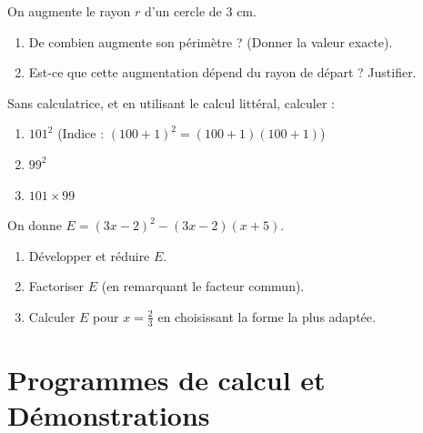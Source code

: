 \documentclass[a4paper]{book}
\begin{document}
    \begin{exercice}
        On augmente le rayon $r$ d'un cercle de 3 cm. 
        \begin{enumerate}
            \item De combien augmente son périmètre ? (Donner la valeur exacte).
            \item Est-ce que cette augmentation dépend du rayon de départ ? Justifier.
        \end{enumerate}
    \end{exercice}

    \begin{exercice}
        Sans calculatrice, et en utilisant le calcul littéral, calculer :
        \begin{enumerate}
            \item $101^2$ (Indice : $(100+1)^2 = (100+1)(100+1)$)
            \item $99^2$ 
            \item $101 \times 99$
        \end{enumerate}
    \end{exercice}
    
    \begin{exercice}
        On donne $E = (3x-2)^2 - (3x-2)(x+5)$.
        \begin{enumerate}
            \item Développer et réduire $E$.
            \item Factoriser $E$ (en remarquant le facteur commun).
            \item Calculer $E$ pour $x = \frac{2}{3}$ en choisissant la forme la plus adaptée.
        \end{enumerate}
    \end{exercice}
    
\newpage %
    
    \section{Programmes de calcul et Démonstrations}
    
\end{document}
